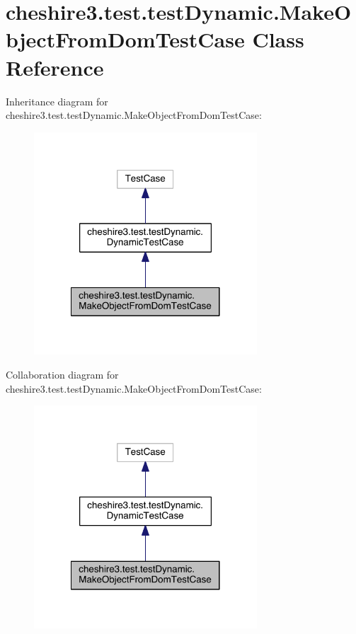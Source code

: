 \hypertarget{classcheshire3_1_1test_1_1test_dynamic_1_1_make_object_from_dom_test_case}{\section{cheshire3.\-test.\-test\-Dynamic.\-Make\-Object\-From\-Dom\-Test\-Case Class Reference}
\label{classcheshire3_1_1test_1_1test_dynamic_1_1_make_object_from_dom_test_case}
}


Inheritance diagram for cheshire3.\-test.\-test\-Dynamic.\-Make\-Object\-From\-Dom\-Test\-Case\-:
\nopagebreak
\begin{figure}[H]
\begin{center}
\leavevmode
\includegraphics[width=236pt]{classcheshire3_1_1test_1_1test_dynamic_1_1_make_object_from_dom_test_case__inherit__graph}
\end{center}
\end{figure}


Collaboration diagram for cheshire3.\-test.\-test\-Dynamic.\-Make\-Object\-From\-Dom\-Test\-Case\-:
\nopagebreak
\begin{figure}[H]
\begin{center}
\leavevmode
\includegraphics[width=236pt]{classcheshire3_1_1test_1_1test_dynamic_1_1_make_object_from_dom_test_case__coll__graph}
\end{center}
\end{figure}
